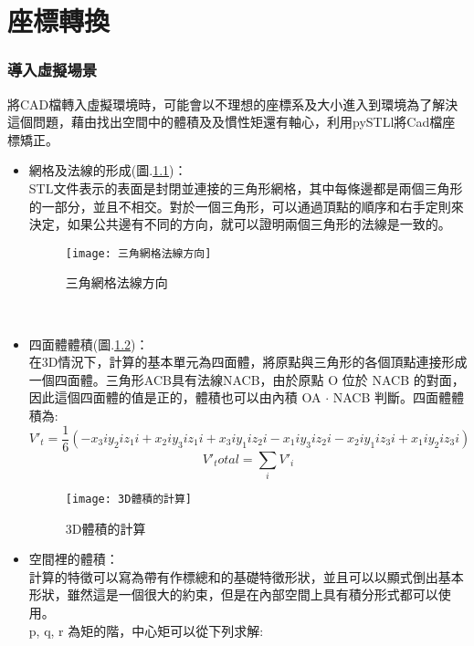 \chapter{座標轉換}
\subsection{導入虛擬場景}
將CAD檔轉入虛擬環境時，可能會以不理想的座標系及大小進入到環境為了解決這個問題，藉由找出空間中的體積及及慣性矩還有軸心，利用pySTLl將Cad檔座標矯正。\\
\begin{itemize}
\item 網格及法線的形成(圖.\ref{三角網格法線方向})：\\
STL文件表示的表面是封閉並連接的三角形網格，其中每條邊都是兩個三角形的一部分，並且不相交。對於一個三角形，可以通過頂點的順序和右手定則來決定，如果公共邊有不同的方向，就可以證明兩個三角形的法線是一致的。\\
\begin{figure}[hbt!]
\begin{center}
\texttt{[image: 三角網格法線方向]}
\caption{\Large 三角網格法線方向}\label{三角網格法線方向}
\end{center}
\end{figure}
\\
\item 四面體體積(圖.\ref{3D體積的計算})：\\
在3D情況下，計算的基本單元為四面體，將原點與三角形的各個頂點連接形成一個四面體。三角形ACB具有法線NACB，由於原點 O 位於 NACB 的對面，因此這個四面體的值是正的，體積也可以由內積 OA $\cdot$ NACB 判斷。四面體體積為:\\
$$ V'_t = \frac{1}{6}(-x_3i y_2i z_1i + x_2i y_3i z_1i + x_3i y_1i z_2i - x_1i y_3i z_2i - x_2i y_1i z_3i + x_1i y_2i z_3i) $$
$$ V'_total= \sum_{i}V'_i$$

\begin{figure}[hbt!]
\begin{center}
\texttt{[image: 3D體積的計算]}
\caption{\Large 3D體積的計算}\label{3D體積的計算}
\end{center}
\end{figure}
\item 空間裡的體積：\\
計算的特徵可以寫為帶有作標總和的基礎特徵形狀，並且可以以顯式倒出基本形狀，雖然這是一個很大的約束，但是在內部空間上具有積分形式都可以使用。\\
 p, q, r 為矩的階，中心矩可以從下列求解:\\


\end{itemize}
